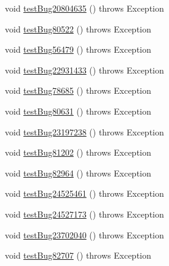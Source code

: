 \begin{DoxyCompactItemize}
\item 
void \mbox{\hyperlink{classtestsuite_1_1regression_1_1_result_set_regression_test_a73eb842a830acedbf8af195858dfc58f}{test\+Bug20804635}} ()  throws Exception 
\item 
void \mbox{\hyperlink{classtestsuite_1_1regression_1_1_result_set_regression_test_ad8d477bdbce9cdf7a7934f944d398fb3}{test\+Bug80522}} ()  throws Exception 
\item 
void \mbox{\hyperlink{classtestsuite_1_1regression_1_1_result_set_regression_test_a67434549c3d855d48d611b6eff810242}{test\+Bug56479}} ()  throws Exception 
\item 
void \mbox{\hyperlink{classtestsuite_1_1regression_1_1_result_set_regression_test_a4280c4f75edf35720e0d0c71a78dfc3b}{test\+Bug22931433}} ()  throws Exception 
\item 
void \mbox{\hyperlink{classtestsuite_1_1regression_1_1_result_set_regression_test_a438ea870d217dc3c5a0df443b040c99f}{test\+Bug78685}} ()  throws Exception 
\item 
void \mbox{\hyperlink{classtestsuite_1_1regression_1_1_result_set_regression_test_a6e1a80555921fe0d80bc15731cb1d63d}{test\+Bug80631}} ()  throws Exception 
\item 
void \mbox{\hyperlink{classtestsuite_1_1regression_1_1_result_set_regression_test_ac1e7b24d29571cdb490adf701dafaf34}{test\+Bug23197238}} ()  throws Exception 
\item 
void \mbox{\hyperlink{classtestsuite_1_1regression_1_1_result_set_regression_test_aed8cd6b2bbcd1c46e0dc18214e1b59da}{test\+Bug81202}} ()  throws Exception 
\item 
void \mbox{\hyperlink{classtestsuite_1_1regression_1_1_result_set_regression_test_ace4a217898fd277518ec5825825afff7}{test\+Bug82964}} ()  throws Exception 
\item 
void \mbox{\hyperlink{classtestsuite_1_1regression_1_1_result_set_regression_test_a448319c15d5ce9214d504185c6c3db4b}{test\+Bug24525461}} ()  throws Exception 
\item 
void \mbox{\hyperlink{classtestsuite_1_1regression_1_1_result_set_regression_test_a7f1e4ac0d4e590dbb25dea141a8145a8}{test\+Bug24527173}} ()  throws Exception 
\item 
void \mbox{\hyperlink{classtestsuite_1_1regression_1_1_result_set_regression_test_aeea941d7e449375b72a8322fc87a9b06}{test\+Bug23702040}} ()  throws Exception 
\item 
void \mbox{\hyperlink{classtestsuite_1_1regression_1_1_result_set_regression_test_a688d90e50548f04a0b619036771f036b}{test\+Bug82707}} ()  throws Exception 

\end{DoxyCompactItemize}
